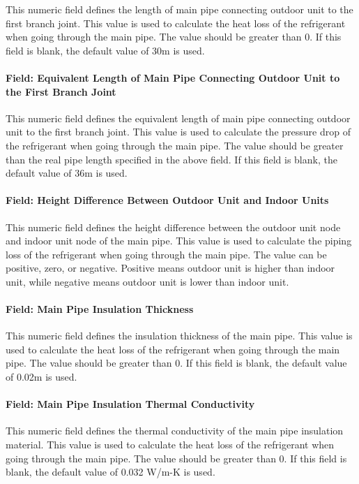 This numeric field defines the length of main pipe connecting outdoor unit to the first branch joint. This value is used to calculate the heat loss of the refrigerant when going through the main pipe. The value should be greater than 0. If this field is blank, the default value of 30m is used.

\paragraph{Field: Equivalent Length of Main Pipe Connecting Outdoor Unit to the First Branch Joint}

This numeric field defines the equivalent length of main pipe connecting outdoor unit to the first branch joint. This value is used to calculate the pressure drop of the refrigerant when going through the main pipe. The value should be greater than the real pipe length specified in the above field. If this field is blank, the default value of 36m is used.

\paragraph{Field: Height Difference Between Outdoor Unit and Indoor Units}

This numeric field defines the height difference between the outdoor unit node and indoor unit node of the main pipe. This value is used to calculate the piping loss of the refrigerant when going through the main pipe. The value can be positive, zero, or negative. Positive means outdoor unit is higher than indoor unit, while negative means outdoor unit is lower than indoor unit.

\paragraph{Field: Main Pipe Insulation Thickness}

This numeric field defines the insulation thickness of the main pipe. This value is used to calculate the heat loss of the refrigerant when going through the main pipe. The value should be greater than 0. If this field is blank, the default value of 0.02m is used.

\paragraph{Field: Main Pipe Insulation Thermal Conductivity}

This numeric field defines the thermal conductivity of the main pipe insulation material. This value is used to calculate the heat loss of the refrigerant when going through the main pipe. The value should be greater than 0. If this field is blank, the default value of 0.032 W/m-K is used.

